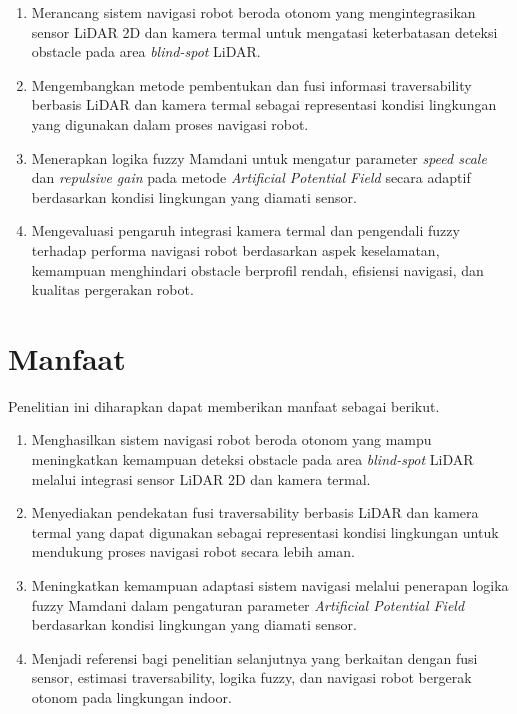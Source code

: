\begin{enumerate}
\item Merancang sistem navigasi robot beroda otonom yang mengintegrasikan sensor LiDAR 2D dan kamera termal untuk mengatasi keterbatasan deteksi obstacle pada area \textit{blind-spot} LiDAR.
\item Mengembangkan metode pembentukan dan fusi informasi traversability berbasis LiDAR dan kamera termal sebagai representasi kondisi lingkungan yang digunakan dalam proses navigasi robot.
\item Menerapkan logika fuzzy Mamdani untuk mengatur parameter \textit{speed scale} dan \textit{repulsive gain} pada metode \textit{Artificial Potential Field} secara adaptif berdasarkan kondisi lingkungan yang diamati sensor.
\item Mengevaluasi pengaruh integrasi kamera termal dan pengendali fuzzy terhadap performa navigasi robot berdasarkan aspek keselamatan, kemampuan menghindari obstacle berprofil rendah, efisiensi navigasi, dan kualitas pergerakan robot.
\end{enumerate}

\section{Manfaat}
\label{sec:Manfaat}

Penelitian ini diharapkan dapat memberikan manfaat sebagai berikut.

\begin{enumerate}
\item Menghasilkan sistem navigasi robot beroda otonom yang mampu meningkatkan kemampuan deteksi obstacle pada area \textit{blind-spot} LiDAR melalui integrasi sensor LiDAR 2D dan kamera termal.
\item Menyediakan pendekatan fusi traversability berbasis LiDAR dan kamera termal yang dapat digunakan sebagai representasi kondisi lingkungan untuk mendukung proses navigasi robot secara lebih aman.
\item Meningkatkan kemampuan adaptasi sistem navigasi melalui penerapan logika fuzzy Ma\-mdani dalam pengaturan parameter \textit{Artificial Potential Field} berdasarkan kondisi lingkungan yang diamati sensor.
\item Menjadi referensi bagi penelitian selanjutnya yang berkaitan dengan fusi sensor, estimasi traversability, logika fuzzy, dan navigasi robot bergerak otonom pada lingkungan indoor.
\end{enumerate}
